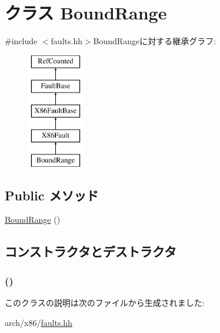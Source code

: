 \hypertarget{classX86ISA_1_1BoundRange}{
\section{クラス BoundRange}
\label{classX86ISA_1_1BoundRange}
}


{\ttfamily \#include $<$faults.hh$>$}BoundRangeに対する継承グラフ:\begin{figure}[H]
\begin{center}
\leavevmode
\includegraphics[height=5cm]{classX86ISA_1_1BoundRange}
\end{center}
\end{figure}
\subsection*{Public メソッド}
\begin{DoxyCompactItemize}
\item 
\hyperlink{classX86ISA_1_1BoundRange_a9090bf41acabf9ab2f603fbe8915ea6d}{BoundRange} ()
\end{DoxyCompactItemize}


\subsection{コンストラクタとデストラクタ}
\hypertarget{classX86ISA_1_1BoundRange_a9090bf41acabf9ab2f603fbe8915ea6d}{
\subsubsection[{BoundRange}]{ ()}}
\label{classX86ISA_1_1BoundRange_a9090bf41acabf9ab2f603fbe8915ea6d}



\begin{DoxyCode}
239                      :
240             X86Fault("Bound-Range", "#BR", 5)
241         {}
    };
\end{DoxyCode}


このクラスの説明は次のファイルから生成されました:\begin{DoxyCompactItemize}
\item 
arch/x86/\hyperlink{arch_2x86_2faults_8hh}{faults.hh}\end{DoxyCompactItemize}
